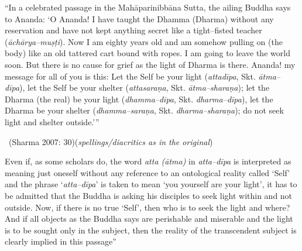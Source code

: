 \begin{myquote}
“In a celebrated passage in the Mahāparinibbāna Sutta, the ailing Buddha says to Ananda: ‘O Ananda! I have taught the Dhamma (Dharma) without any reservation and have not kept anything secret like a tight–fisted teacher (\textit{āchārya–muṣṭi}). Now I am eighty years old and am somehow pulling on (the body) like an old tattered cart bound with ropes. I am going to leave the world soon. But there is no cause for grief as the light of Dharma is there. Ananda! my message for all of you is this: Let the Self be your light (\textit{attadīpa}, Skt. \textit{ātma–dīpa}), let the Self be your shelter (\textit{attasaraṇa}, Skt. \textit{ātma–sharaṇa}); let the Dharma (the real) be your light (\textit{dhamma–dīpa}, Skt. \textit{dharma–dīpa}), let the Dharma be your shelter (\textit{dhamma–saraṇa}, Skt. \textit{dharma–sharaṇa}); do not seek light and shelter outside.’” 

~\hfill (Sharma 2007: 30)(\textit{spellings/diacritics as in the original})
\end{myquote}

Even if, as some scholars do, the word \textit{atta (ātma)} in \textit{atta–dīpa} is interpreted as meaning just oneself without any reference to an ontological reality called ‘Self’ and the phrase ‘\textit{atta–dīpa}’ is taken to mean ‘you yourself are your light’, it has to be admitted that the Buddha is asking his disciples to seek light within and not outside. Now, if there is no true ‘Self’, then who is to seek the light and where? And if all objects as the Buddha says are perishable and miserable and the light is to be sought only in the subject, then the reality of the transcendent subject is clearly implied in this passage”

